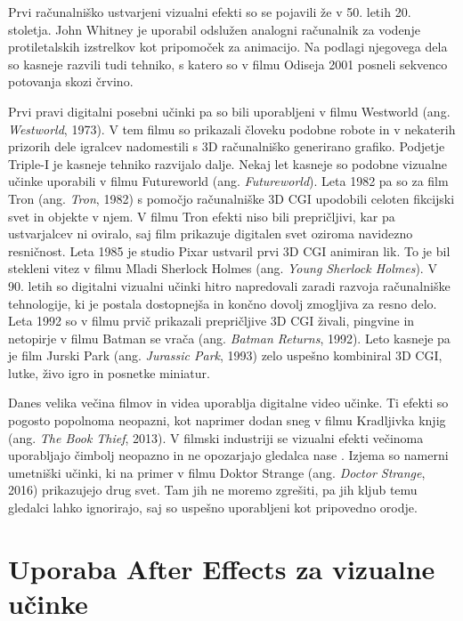 \documentclass[a4paper, 12pt]{book}
\begin{document}
Prvi računalniško ustvarjeni vizualni efekti so se pojavili že v 50. letih 20. stoletja. 
John Whitney je uporabil odslužen analogni računalnik za vodenje protiletalskih izstrelkov kot pripomoček za animacijo. 
Na podlagi njegovega dela so kasneje razvili tudi tehniko, s katero so v filmu Odiseja 2001 posneli sekvenco potovanja skozi črvino.

Prvi pravi digitalni posebni učinki pa so bili uporabljeni v filmu Westworld (ang. {\it Westworld}, 1973). %
V tem filmu so prikazali človeku podobne robote in v nekaterih prizorih dele igralcev nadomestili s 3D računalniško generirano grafiko. 
Podjetje Triple-I je kasneje tehniko razvijalo dalje.
Nekaj let kasneje so podobne vizualne učinke uporabili v filmu Futureworld (ang. {\it Futureworld}).
Leta 1982 pa so za film Tron (ang. {\it Tron}, 1982) s pomočjo računalniške 3D CGI upodobili celoten fikcijski svet in objekte v njem.
V filmu Tron efekti niso bili prepričljivi, kar pa ustvarjalcev ni oviralo, saj film prikazuje digitalen svet oziroma navidezno resničnost.
Leta 1985 je studio Pixar ustvaril prvi 3D CGI animiran lik.
To je bil stekleni vitez v filmu Mladi Sherlock Holmes (ang. {\it Young Sherlock Holmes}).
V 90. letih so digitalni vizualni učinki hitro napredovali zaradi razvoja računalniške tehnologije, ki je postala dostopnejša in končno dovolj zmogljiva za resno delo.
Leta 1992 so v filmu prvič prikazali prepričljive 3D CGI živali, pingvine in netopirje v filmu Batman se vrača (ang. {\it Batman Returns}, 1992).
Leto kasneje pa je film Jurski Park (ang. {\it Jurassic Park}, 1993) zelo uspešno kombiniral 3D CGI, lutke, živo igro in posnetke miniatur. 

Danes velika večina filmov in videa uporablja digitalne video učinke. 
Ti efekti so pogosto popolnoma neopazni, kot naprimer dodan sneg v filmu Kradljivka knjig (ang. {\it The Book Thief}, 2013). %
V filmski industriji se vizualni efekti večinoma uporabljajo čimbolj neopazno in ne opozarjajo gledalca nase \cite{vesHandbook}.
Izjema so namerni umetniški učinki, ki na primer v filmu Doktor Strange (ang. {\it Doctor Strange}, 2016) prikazujejo drug svet. 
Tam jih ne moremo zgrešiti, pa jih kljub temu gledalci lahko ignorirajo, saj so uspešno uporabljeni kot pripovedno orodje.


\chapter{Uporaba After Effects za vizualne učinke}
\end{document}
